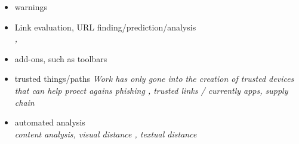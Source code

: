 \begin{itemize}
\item warnings \cite{akhawe2013alice, warnings}

\item Link evaluation, URL finding/prediction/analysis\\
\emph{\cite{Bar-Yossef:2009:CDD:1462148.1462151,balzarotti2012proactive, prakash2010phishnet, zhang2008highly}, \cite{5934995, measurement}}

\item add-ons, such as toolbars \cite{Wu:2006:STA:1124772.1124863, li2007usability, tools, toolbars}

\item trusted things/paths
\emph{Work has only gone into the creation of trusted devices that can help proect agains phishing \cite{phoolproof,fido}, trusted links \cite{bookmarks}/ currently apps, supply chain \cite{router}}

\item automated analysis\\
\emph{content analysis\cite{content}, visual distance \cite{chen2010detecting, chen2009fighting, liu2006antiphishing}, textual distance \cite{zhang2011textual}}
\end{itemize}
